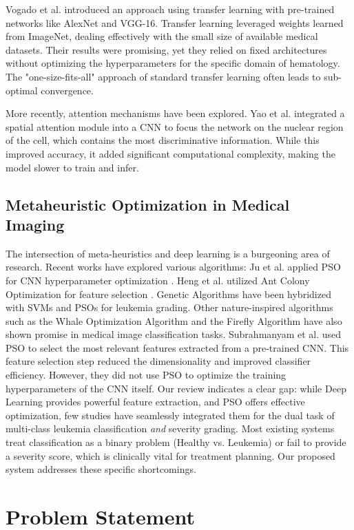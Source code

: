 \documentclass[11pt, a4paper]{article}
\begin{document}
Vogado et al. introduced an approach using transfer learning with pre-trained networks like AlexNet and VGG-16. Transfer learning leveraged weights learned from ImageNet, dealing effectively with the small size of available medical datasets. Their results were promising, yet they relied on fixed architectures without optimizing the hyperparameters for the specific domain of hematology. The "one-size-fits-all" approach of standard transfer learning often leads to sub-optimal convergence.

More recently, attention mechanisms have been explored. Yao et al. integrated a spatial attention module into a CNN to focus the network on the nuclear region of the cell, which contains the most discriminative information. While this improved accuracy, it added significant computational complexity, making the model slower to train and infer.

\subsection{Metaheuristic Optimization in Medical Imaging}
The intersection of meta-heuristics and deep learning is a burgeoning area of research. Recent works have explored various algorithms: Ju et al. applied PSO for CNN hyperparameter optimization \cite{r16}. Heng et al. utilized Ant Colony Optimization for feature selection \cite{r17}. Genetic Algorithms have been hybridized with SVMs \cite{r18} and PSOs \cite{r20} for leukemia grading. Other nature-inspired algorithms such as the Whale Optimization Algorithm \cite{r19} and the Firefly Algorithm \cite{r21} have also shown promise in medical image classification tasks.
Subrahmanyam et al. used PSO to select the most relevant features extracted from a pre-trained CNN. This feature selection step reduced the dimensionality and improved classifier efficiency. However, they did not use PSO to optimize the training hyperparameters of the CNN itself.
Our review indicates a clear gap: while Deep Learning provides powerful feature extraction, and PSO offers effective optimization, few studies have seamlessly integrated them for the dual task of multi-class leukemia classification \textit{and} severity grading. Most existing systems treat classification as a binary problem (Healthy vs. Leukemia) or fail to provide a severity score, which is clinically vital for treatment planning. Our proposed system addresses these specific shortcomings.

\section{Problem Statement}
\end{document}
